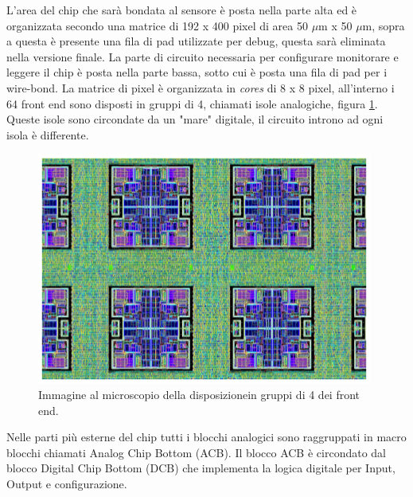 L'area del chip che sarà bondata al sensore è posta nella parte alta ed è organizzata secondo una matrice di 192 x 400 pixel di area 50 $\mu$m x 50 $\mu$m, sopra a questa è presente una fila di pad utilizzate per debug, questa sarà eliminata nella versione finale. La parte di circuito necessaria per configurare monitorare e leggere il chip è posta nella parte bassa, sotto cui è posta una fila di pad per i wire-bond. 
La matrice di pixel è organizzata in \textit{cores} di 8 x 8 pixel, all'interno i 64 front end sono disposti in gruppi di 4, chiamati isole analogiche, figura \ref{AnalogIsland}. 
Queste isole sono circondate da un "mare" digitale, il circuito introno ad ogni isola è differente. 
\begin{figure}
\centering
\includegraphics[scale=.5]{Immagini/AnalogIsland}
\caption{Immagine al microscopio della disposizionein gruppi di 4 dei front end.}
\label{AnalogIsland}
\end{figure} 
Nelle parti più esterne del chip tutti i blocchi analogici sono raggruppati in macro blocchi chiamati Analog Chip Bottom (ACB). Il blocco ACB è circondato dal blocco Digital Chip Bottom (DCB) che implementa la logica digitale per Input, Output e configurazione.
